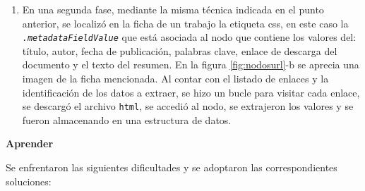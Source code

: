 \documentclass[
  12pt,
  openany]{book}
\providecommand{\tightlist}{%
  \setlength{\itemsep}{0pt}\setlength{\parskip}{0pt}}
\begin{document}
\begin{enumerate}
\def\labelenumi{\arabic{enumi}.}
\setcounter{enumi}{1}
\tightlist
\item
  En una segunda fase, mediante la misma técnica indicada en el punto anterior, se localizó en la ficha de un trabajo la etiqueta css, en este caso la \emph{\texttt{.metadataFieldValue}} que está asociada al nodo que contiene los valores del: título, autor, fecha de publicación, palabras clave, enlace de descarga del documento y el texto del resumen. En la figura \ref{fig:nodosurl}-b se aprecia una imagen de la ficha mencionada. Al contar con el listado de enlaces y la identificación de los datos a extraer, se hizo un bucle para visitar cada enlace, se descargó el archivo \texttt{html}, se accedió al nodo, se extrajeron los valores y se fueron almacenando en una estructura de datos.
\end{enumerate}

\textbf{Aprender}

Se enfrentaron las siguientes dificultades y se adoptaron las correspondientes soluciones:
\end{document}
